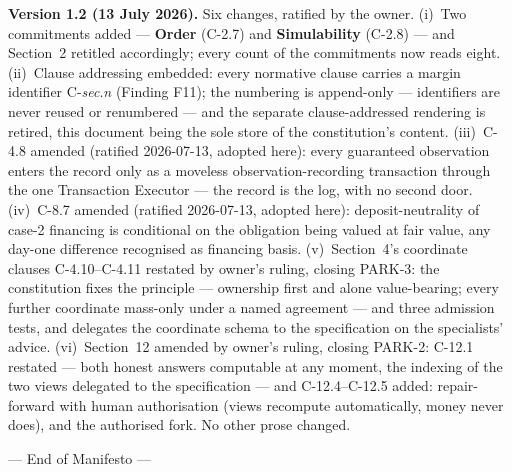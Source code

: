 \documentclass[11pt,a4paper]{article}
\begin{document}
\textbf{Version 1.2 (13 July 2026).} Six changes, ratified by the
owner. (i)~Two commitments added --- \textbf{Order} (C-2.7) and
\textbf{Simulability} (C-2.8) --- and Section~2 retitled accordingly;
every count of the commitments now reads eight. (ii)~Clause addressing
embedded: every normative clause carries a margin identifier
C-\emph{sec}.\emph{n} (Finding F11); the numbering is append-only ---
identifiers are never reused or renumbered --- and the separate
clause-addressed rendering is retired, this document being the sole
store of the constitution's content. (iii)~C-4.8 amended (ratified
2026-07-13, adopted here): every guaranteed observation enters the
record only as a moveless observation-recording transaction through the
one Transaction Executor --- the record is the log, with no second
door. (iv)~C-8.7 amended (ratified 2026-07-13, adopted here):
deposit-neutrality of case-2 financing is conditional on the obligation
being valued at fair value, any day-one difference recognised as
financing basis. (v)~Section~4's coordinate clauses C-4.10--C-4.11
restated by owner's ruling, closing PARK-3: the constitution fixes the
principle --- ownership first and alone value-bearing; every further
coordinate mass-only under a named agreement --- and three admission
tests, and delegates the coordinate schema to the specification on the
specialists' advice. (vi)~Section~12 amended by owner's ruling, closing
PARK-2: C-12.1 restated --- both honest answers computable at any
moment, the indexing of the two views delegated to the specification
--- and C-12.4--C-12.5 added: repair-forward with human authorisation
(views recompute automatically, money never does), and the authorised
fork. No other prose changed.

--- End of Manifesto ---
\end{document}
